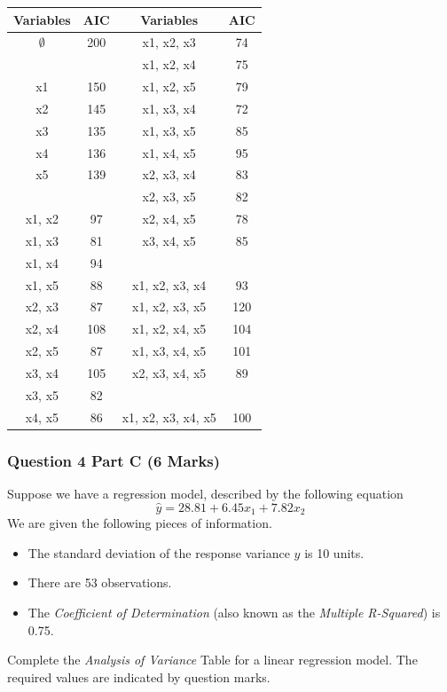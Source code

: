 \documentclass[a4paper,12pt]{article}
\begin{document}
{
	\large
	\begin{center}
		\begin{tabular}{||c|c||c|c||}
			\hline
			Variables & AIC & Variables & AIC \\ \hline \hline
			$\emptyset$	&	200	&	x1, x2, x3	&	74	\\ \hline
			\phantom{makemakespace}
			&	\phantom{makespace}
			&	x1, x2, x4	&	75	\\ \hline
			x1	&	150	&	x1, x2, x5	&	79	\\ \hline
			x2	&	145	&	x1, x3, x4	&	72	\\ \hline
			x3	&	135	&	x1, x3, x5	&	85	\\ \hline
			x4	&	136	&	x1, x4, x5	&	95	\\ \hline
			x5	&	139	&	x2, x3, x4	&	83	\\ \hline
			&		&	x2, x3, x5	&	82	\\ \hline
			x1, x2	&	97	&	x2, x4, x5	&	78	\\ \hline
			x1, x3	&	81	&	x3, x4, x5	&	85	\\ \hline
			x1, x4	&	94	&	\phantom{makemakespace}
			&	\phantom{makespace}
			\\ \hline
			x1, x5	&	88	&	x1, x2, x3, x4	&	93	\\ \hline
			x2, x3	&	87	&	x1, x2, x3, x5	&	120	\\ \hline
			x2, x4	&	108	&	x1, x2, x4, x5	&	104	\\ \hline
			x2, x5	&	87	&	x1, x3, x4, x5	&	101	\\ \hline
			x3, x4	&	105	&	x2, x3, x4, x5	&	89	\\ \hline
			x3, x5	&	82	&		&		\\ \hline
			x4, x5	&	86	&	x1, x2, x3, x4, x5	&	100	\\ \hline
		\end{tabular} 
	\end{center}
}
\newpage
\subsubsection*{Question 4 Part C (6 Marks)}
Suppose we have a regression model, described by the following equation
\[ \hat{y} = 28.81 + 6.45x_1 + 7.82 x_2\]
We are given the following pieces of information.
\begin{itemize}
	\item The standard deviation of the response variance $y$ is 10 units.
	\item There are 53 observations.
	\item The \textit{Coefficient of Determination} (also known as the \textit{Multiple R-Squared}) is 0.75.
\end{itemize}
Complete the \textit{Analysis of Variance} Table for a linear regression model.
The required values are indicated by question marks.
\end{document}
